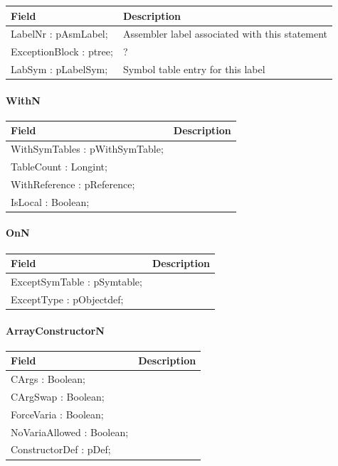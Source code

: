 \documentclass [a4paper,12pt]{article}
\begin{document}
\begin{longtable}{|l|p{10cm}|}
\hline
Field   & Description \\
\hline
\endhead
\hline
\endfoot
\textsf{LabelNr : pAsmLabel;}   & Assembler label associated with this statement \\
\textsf{ExceptionBlock : ptree;}& ? \\
\textsf{LabSym : pLabelSym;}    & Symbol table entry for this label
\label{tab31}
\end{longtable}

\paragraph{WithN}\mbox{}

\begin{longtable}{|l|p{10cm}|}
\hline
Field   & Description \\
\hline
\endhead
\hline
\endfoot
\textsf{WithSymTables : pWithSymTable;} &  \\
\textsf{TableCount : Longint;}      &  \\
\textsf{WithReference : pReference;}    &  \\
\textsf{IsLocal : Boolean;}     & 
\label{tab32}
\end{longtable}

\paragraph{OnN}\mbox{}

\begin{longtable}{|l|p{10cm}|}
\hline
Field   & Description \\
\hline
\endhead
\hline
\endfoot
\textsf{ExceptSymTable : pSymtable;}&  \\
\textsf{ExceptType : pObjectdef;}& 
\label{tab33}
\end{longtable}

\paragraph{ArrayConstructorN}\mbox{}

\begin{longtable}{|l|p{10cm}|}
\hline
Field   & Description \\
\hline
\endhead
\hline
\endfoot
\textsf{CArgs : Boolean;}       &  \\
\textsf{CArgSwap : Boolean;}        &  \\
\textsf{ForceVaria : Boolean;}      &  \\
\textsf{NoVariaAllowed : Boolean;}  &  \\
\textsf{ConstructorDef : pDef;}     & 
\label{tab34}
\end{longtable}
\end{document}
